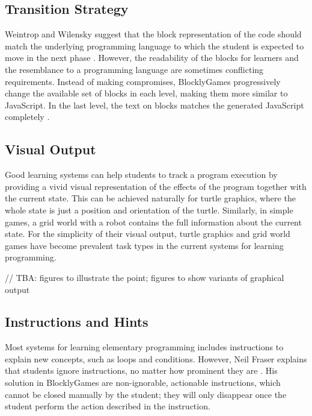 \documentclass[
    digital,
    color,
    11pt,
    nocover,
    table,  %
    nolof,  %
    nolot,  %
    microtype,
]{fithesis3}
\begin{document}
\subsection{Transition Strategy}
\label{sec:transition-strategy}
Weintrop and Wilensky suggest that the block representation of the code
  should match the underlying programming language
  to which the student is expected to move in the next phase
  \cite{challenges-of-blocks-based-environments}.
However, the readability of the blocks for learners
  and the resemblance to a programming language
  are sometimes conflicting requirements.
Instead of making compromises,
  BlocklyGames progressively change the available set of blocks in each level,
  making them more similar to JavaScript.
In the last level,
  the text on blocks matches the generated JavaScript completely
  \cite{blockly-10-things}.


\subsection{Visual Output}
\label{sec:visual-output}

Good learning systems can help students to track a program execution
  by providing a vivid visual representation of the effects of the program
  together with the current state.
This can be achieved naturally for turtle graphics,
  where the whole state is just a position and orientation of the turtle.
Similarly, in simple games, a grid world with a robot
  contains the full information about the current state.
For the simplicity of their visual output,
  turtle graphics and grid world games have become prevalent task types
  in the current systems for learning programming.

// TBA: figures to illustrate the point; figures to show variants of graphical output


\subsection{Instructions and Hints}
\label{sec:instructions-and-hints}

Most systems for learning elementary programming includes instructions
  to explain new concepts, such as loops and conditions.
However, Neil Fraser explains that students ignore instructions,
  no matter how prominent they are \cite{blockly-10-things}.
His solution in BlocklyGames are non-ignorable, actionable instructions,
  which cannot be closed manually by the student;
  they will only disappear once the student perform the action described in the instruction.
\end{document}
